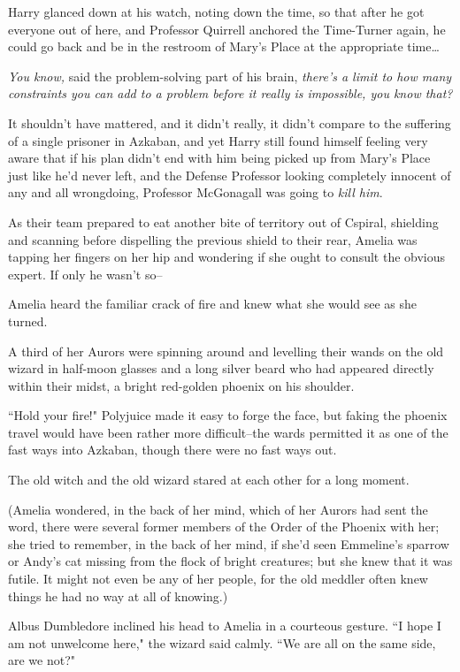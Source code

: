 Harry glanced down at his watch, noting down the time, so that after he got everyone out of here, and Professor Quirrell anchored the Time-Turner again, he could go back and be in the restroom of Mary's Place at the appropriate time{\ldots}

\emph{You know,} said the problem-solving part of his brain, \emph{there's a limit to how many constraints you can add to a problem before it \emph{really is} impossible, you know that?}

It shouldn't have mattered, and it didn't really, it didn't compare to the suffering of a single prisoner in Azkaban, and yet Harry still found himself feeling very aware that if his plan didn't end with him being picked up from Mary's Place just like he'd never left, and the Defense Professor looking completely innocent of any and all wrongdoing, Professor McGonagall was going to \emph{kill him}.

\later

As their team prepared to eat another bite of territory out of C\?spiral, shielding and scanning before dispelling the previous shield to their rear, Amelia was tapping her fingers on her hip and wondering if she ought to consult the obvious expert. If only he wasn't so\---

Amelia heard the familiar crack of fire and knew what she would see as she turned.

A third of her Aurors were spinning around and levelling their wands on the old wizard in half-moon glasses and a long silver beard who had appeared directly within their midst, a bright red-golden phoenix on his shoulder.

``Hold your fire!" Polyjuice made it easy to forge the face, but faking the phoenix travel would have been rather more difficult\---the wards permitted it as one of the fast ways into Azkaban, though there were no fast ways out.

The old witch and the old wizard stared at each other for a long moment.

(Amelia wondered, in the back of her mind, which of her Aurors had sent the word, there were several former members of the Order of the Phoenix with her; she tried to remember, in the back of her mind, if she'd seen Emmeline's sparrow or Andy's cat missing from the flock of bright creatures; but she knew that it was futile. It might not even be any of her people, for the old meddler often knew things he had no way at all of knowing.)

Albus Dumbledore inclined his head to Amelia in a courteous gesture. ``I hope I am not unwelcome here," the wizard said calmly. ``We are all on the same side, are we not?"

